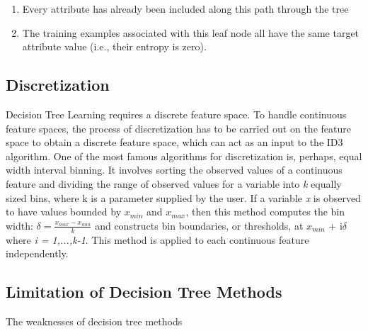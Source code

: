 \documentclass[12pt]{report}
\begin{document}
\begin{enumerate}
\item{Every attribute has already been included along this path through the tree}
\item{The training examples associated with this leaf node all have the same target attribute value (i.e., their entropy is zero).} 

\end{enumerate}

\subsection{Discretization}

Decision Tree Learning requires a discrete feature space. To handle continuous feature spaces, the process of discretization has to be carried out on the feature space to obtain a discrete feature space, which can act as an input to the ID3 algorithm. One of the most famous algorithms for discretization is, perhaps, equal width interval binning. It involves sorting the observed values of a continuous feature and dividing the range of observed values for a variable into \textit{k} equally sized bins, where k is a parameter supplied by the user. If a variable \textit{x} is observed to have values bounded by $x_{min}$ and $x_{max}$, then this method computes the bin width:         \begin{math}\delta = \frac{x_{max} - x_{min}}{k} \end{math}
and constructs bin boundaries, or thresholds, at $x_{min}$ + i$\delta$ where \textit{i = 1,...,k-1}. This method is applied to each continuous feature independently.

\subsection{Limitation of Decision Tree Methods}
The weaknesses of decision tree methods
\end{document}
